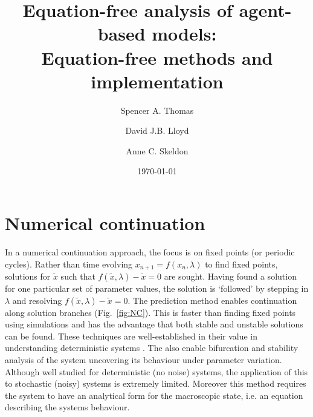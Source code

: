\documentclass[11pt]{article}
\begin{document}
\title{Equation-free analysis of agent-based models:\\Equation-free methods and implementation}

\author{Spencer A. Thomas}
\author{David J.B. Lloyd}
\author{Anne C. Skeldon}
\date{\today}
\maketitle



\section{Numerical continuation}
\label{sec:NC}

In a numerical continuation approach, the focus is on fixed points 
(or periodic cycles). Rather than time evolving $x_{n+1} =f(x_n,\lambda)$ to find fixed points, solutions for $\tilde x$ such that
$ f(\tilde x, \lambda)-\tilde x = 0$ are sought. Having found a solution for one particular set of parameter values, 
the solution is `followed' by stepping in $\lambda$ and resolving
$ f(\tilde x, \lambda)-\tilde x = 0.$ The prediction method enables continuation along solution branches (Fig.~\ref{fig:NC}).
This is faster than finding fixed points using simulations and has the
advantage that both stable and unstable solutions can be found. These techniques are 
well-established in their value in understanding deterministic systems \cite{Allgower1990}. The also enable bifurcation and stability analysis of the system uncovering its behaviour under parameter variation. Although well studied for deterministic (no noise) systems, the application of this to stochastic (noisy) systems is extremely limited. Moreover this method requires the system to have an analytical form for the macroscopic state, i.e. an equation describing the systems behaviour. 
\end{document}
